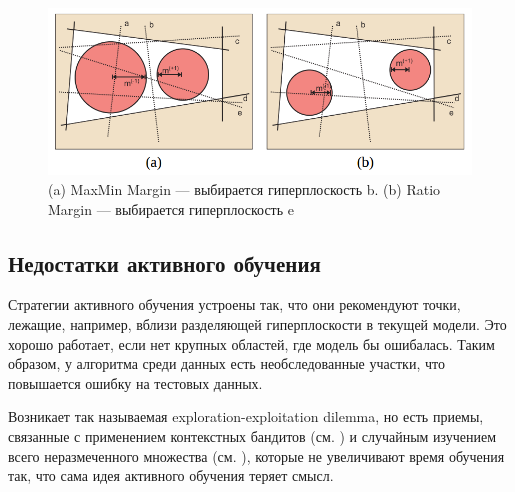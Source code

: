 \documentclass[specialist, 12pt, href]{article}
\begin{document}
\begin{figure}[htbp]
\centering
\includegraphics[width=5in]{img/maxminmargin.png}
\caption{(a) MaxMin Margin --- выбирается гиперплоскость b. (b)
Ratio Margin --- выбирается гиперплоскость e}
\end{figure}

\subsection{Недостатки активного
обучения}

Стратегии активного обучения устроены так, что они рекомендуют точки,
лежащие, например, вблизи разделяющей гиперплоскости в текущей модели.
Это хорошо работает, если нет крупных областей, где модель бы ошибалась.
Таким образом, у алгоритма среди данных есть необследованные участки,
что повышается ошибку на тестовых данных.

Возникает так называемая exploration-exploitation dilemma, но есть
приемы, связанные с применением контекстных бандитов (см. \cite{Bouneffouf1}) и случайным изучением всего неразмеченного множества (см.
\cite{Bouneffouf2}), которые не увеличивают время обучения так, что сама
идея активного обучения теряет смысл.



\end{document}
